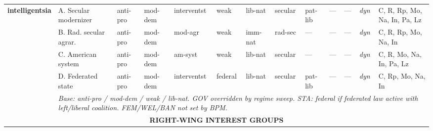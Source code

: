 \documentclass[a4paper]{article}
\newcommand{\nd}{---}
\newcommand{\minorrow}[2]{\rowcolor{minorRow} #1 & \multicolumn{12}{p{22cm}|}{\textit{#2}} \\}
\begin{document}
\begin{footnotesize}
\begin{longtable}{|p{1.8cm}|p{2.3cm}|p{1.55cm}|p{1.65cm}|p{1.65cm}|p{1.3cm}|p{1.5cm}|p{1.5cm}|p{1.5cm}|p{1.3cm}|p{1.45cm}|p{1.0cm}|p{2.65cm}|}
\multirow{5}{*}{\cellcolor{instHdr}\textbf{intelligentsia}} &
  A. Secular modernizer & anti-pro & mod-dem & interventst & weak & lib-nat & secular & pat-lib & \nd & \nd & \textit{dyn} & C, R, Rp, Mo, Na, In, Pa, Lz \\ \cline{2-13}
\cellcolor{instHdr} &
  B. Rad. secular agrar. & anti-pro & mod-dem & mod-agr & weak & imm-nat & rad-sec & \nd & \nd & \nd & \textit{dyn} & C, R, Rp, Mo, Na, In \\ \cline{2-13}
\cellcolor{instHdr} &
  C. American system & anti-pro & mod-dem & am-syst & weak & lib-nat & secular & \nd & \nd & \nd & \textit{dyn} & C, R, Mo, Na, In, Pa, Lz \\ \cline{2-13}
\cellcolor{instHdr} &
  D. Federated state & anti-pro & mod-dem & interventst & federal & lib-nat & secular & pat-lib & \nd & \nd & \textit{dyn} & C, Rp, Mo, Na, In \\ \cline{2-13}
\minorrow{\cellcolor{instHdr}}{Base: anti-pro / mod-dem / weak / lib-nat. GOV overridden by regime sweep. STA: federal if federated law active with left/liberal coalition. FEM/WEL/BAN not set by BPM.}
\hline

\multicolumn{13}{|c|}{\cellcolor{grpRow}\bfseries RIGHT-WING INTEREST GROUPS} \\
\hline


\end{longtable}
\end{footnotesize}
\end{document}

